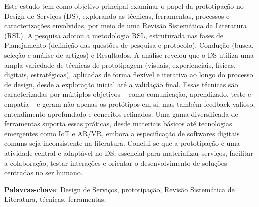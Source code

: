 \begin{resumo}

Este estudo tem como objetivo principal examinar o papel da prototipação no Design de Serviços (DS), explorando as técnicas, ferramentas, processos e caracterizações envolvidas, por meio de uma Revisão Sistemática da Literatura (RSL). A pesquisa adotou a metodologia RSL, estruturada nas fases de Planejamento (definição das questões de pesquisa e protocolo), Condução (busca, seleção e análise de artigos) e Resultados. A análise revelou que o DS utiliza uma ampla variedade de técnicas de prototipagem (visuais, experienciais, físicas, digitais, estratégicas), aplicadas de forma flexível e iterativa ao longo do processo de design, desde a exploração inicial até a validação final. Essas técnicas são caracterizadas por múltiplos objetivos – como comunicação, aprendizado, teste e empatia – e geram não apenas os protótipos em si, mas também feedback valioso, entendimento aprofundado e conceitos refinados. Uma gama diversificada de ferramentas suporta essas práticas, desde materiais básicos até tecnologias emergentes como IoT e AR/VR, embora a especificação de softwares digitais comuns seja inconsistente na literatura. Conclui-se que a prototipação é uma atividade central e adaptável no DS, essencial para materializar serviços, facilitar a colaboração, testar interações e orientar o desenvolvimento de soluções centradas no ser humano.

 \vspace{\onelineskip}
    
 \noindent
 \textbf{Palavras-chave}: Design de Serviços, prototipação, Revisão Sistemática de Literatura, técnicas, ferramentas.
\end{resumo}

